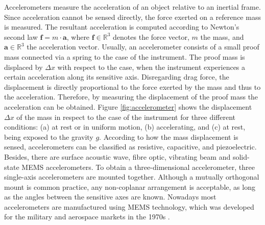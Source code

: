 Accelerometers measure the acceleration of an object relative to an inertial frame. Since acceleration cannot be sensed directly, the force exerted on a reference mass is measured. The resultant acceleration is computed according to Newton's second law $\mathbf{f} = m \cdot \mathbf{a}$, where $ \mathbf{f} \in \mathbb{R}^3$ denotes the force vector, $m$ the mass, and $\mathbf{a} \in \mathbb{R}^3$ the acceleration vector. Usually, an accelerometer consists of a small proof mass connected via a spring to the case of the instrument. The proof mass is displaced  by $\Delta x$ with respect to the case, when the instrument experiences a certain acceleration along its sensitive axis. Disregarding drag force, the displacement is directly proportional to the force exerted by the mass and thus to the acceleration. Therefore, by measuring the displacement of the proof mass the acceleration can be obtained. Figure \ref{fig:accelerometer} shows the displacement $\Delta x$ of the mass in respect to the case of the instrument for three different conditions: (a) at rest or in uniform motion, (b) accelerating, and (c) at rest, being exposed to the gravity $g$. According to how the mass displacement is sensed, accelerometers can be classified as resistive, capacitive, and piezoelectric. Besides, there are surface acoustic wave, fibre optic, vibrating beam and solid-state \gls{MEMS} accelerometers. To obtain a three-dimensional accelerometer, three single-axis accelerometers are mounted together. Although a mutually orthogonal mount is common practice, any non-coplanar arrangement is acceptable, as long as the angles between the sensitive axes are known. Nowadays most accelerometers are manufactured using MEMS technology, which was developed for the military and aerospace markets in the 1970s \cite{bhattacharyya_inertial_sensors_applications_13}. 


